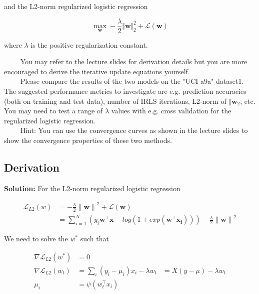 \documentclass[a4paper]{article}
\begin{document}
and the L2-norm regularized logistic regression


\begin{equation}
    \max_{\pmb{w} } - \frac{\lambda}{2}\Vert{\pmb{w}}\Vert_{2}^{2} + \mathcal{L(\pmb{w})}
\end{equation}

where $\lambda$ is the positive regularization constant.

$\qquad$ You may refer to the lecture slides for derivation details but you are more
encouraged to derive the iterative update equations yourself.\\

$\qquad$ Please compare the results of the two models on the "UCI a9a" dataset1. The suggested performance metrics to investigate are e.g. prediction accuracies (both on training and test data), number of IRLS iterations, L2-norm of $\Vert{\pmb{w}}_2$, etc. You may need to test a range of $\lambda$  values with e.g. cross validation for the regularized logistic regression.\\

$\qquad$ Hint: You can use the convergence curves as shown in the lecture slides to
show the convergence properties of these two methods.


\subsection{Derivation}
\textbf{Solution:} For the L2-norm regularized logistic regression


\begin{equation}
    \begin{aligned}
    \mathcal{L}_{L2}(w) &= - \frac{\lambda}{2}{\lVert{\pmb{w}}\rVert}^2 + \mathcal{L(\pmb{w})}\\
    & = \sum_{i=1}^{N}(y_i\pmb{w}^{\top}\pmb{x} - log(1+exp(\pmb{w}^{\top}\pmb{x_i})))  - \frac{\lambda}{2}{\lVert{\pmb{w}}\rVert}^2 
    \end{aligned}
\end{equation}

We need to solve the $w^*$ such that 

\begin{equation}
    \begin{aligned}
    \nabla{\mathcal{L}_{L2}(w^*)} &=0\\
    \nabla{\mathcal{L}_{L2}(w_t)} &=  \sum_{i} {(y_i - \mu_i) x_i} - \lambda w_t 
    &= X(y-\mu) - \lambda w_t \\
    \mu_i &= \psi(w_t^{\top}x_i)
    \end{aligned}
\end{equation}
\end{document}
